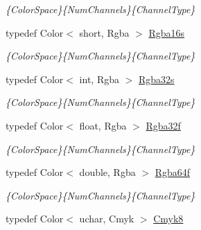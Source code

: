 \begin{DoxyCompactItemize}
\begin{DoxyCompactList}\small\item\em \{Color\-Space\}\{Num\-Channels\}\{Channel\-Type\} \end{DoxyCompactList}\item 
\hypertarget{group___color_types_gad1bf3b9bef5965352169d730ade4734f}{typedef Color$<$ short, Rgba $>$ \hyperlink{group___color_types_gad1bf3b9bef5965352169d730ade4734f}{Rgba16s}}\label{group___color_types_gad1bf3b9bef5965352169d730ade4734f}

\begin{DoxyCompactList}\small\item\em \{Color\-Space\}\{Num\-Channels\}\{Channel\-Type\} \end{DoxyCompactList}\item 
\hypertarget{group___color_types_ga1062cb7223f57b1e790edf0fa1b18fb8}{typedef Color$<$ int, Rgba $>$ \hyperlink{group___color_types_ga1062cb7223f57b1e790edf0fa1b18fb8}{Rgba32s}}\label{group___color_types_ga1062cb7223f57b1e790edf0fa1b18fb8}

\begin{DoxyCompactList}\small\item\em \{Color\-Space\}\{Num\-Channels\}\{Channel\-Type\} \end{DoxyCompactList}\item 
\hypertarget{group___color_types_gac4b7db1a816348334dc73f5718376b8e}{typedef Color$<$ float, Rgba $>$ \hyperlink{group___color_types_gac4b7db1a816348334dc73f5718376b8e}{Rgba32f}}\label{group___color_types_gac4b7db1a816348334dc73f5718376b8e}

\begin{DoxyCompactList}\small\item\em \{Color\-Space\}\{Num\-Channels\}\{Channel\-Type\} \end{DoxyCompactList}\item 
\hypertarget{group___color_types_gaa91c987c346d85fafb22ea6bf2c0e9af}{typedef Color$<$ double, Rgba $>$ \hyperlink{group___color_types_gaa91c987c346d85fafb22ea6bf2c0e9af}{Rgba64f}}\label{group___color_types_gaa91c987c346d85fafb22ea6bf2c0e9af}

\begin{DoxyCompactList}\small\item\em \{Color\-Space\}\{Num\-Channels\}\{Channel\-Type\} \end{DoxyCompactList}\item 
\hypertarget{group___color_types_ga81bb1ed4487c531ae4349fcf5c65772b}{typedef Color$<$ uchar, Cmyk $>$ \hyperlink{group___color_types_ga81bb1ed4487c531ae4349fcf5c65772b}{Cmyk8}}\label{group___color_types_ga81bb1ed4487c531ae4349fcf5c65772b}


\end{DoxyCompactItemize}
